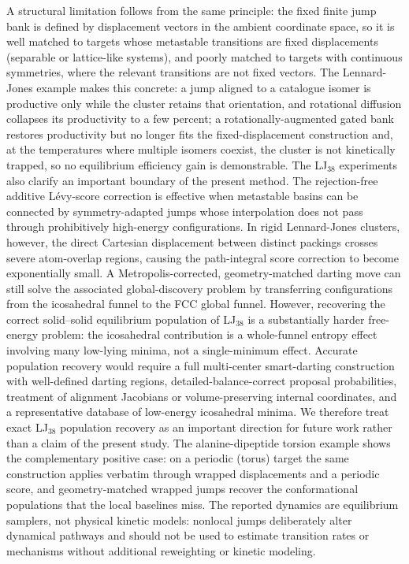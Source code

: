 A structural limitation follows from the same principle: the fixed finite jump bank is defined by displacement vectors in the ambient coordinate space, so it is well matched to targets whose metastable transitions are fixed displacements (separable or lattice-like systems), and poorly matched to targets with continuous symmetries, where the relevant transitions are not fixed vectors. The Lennard-Jones example makes this concrete: a jump aligned to a catalogue isomer is productive only while the cluster retains that orientation, and rotational diffusion collapses its productivity to a few percent; a rotationally-augmented gated bank restores productivity but no longer fits the fixed-displacement construction and, at the temperatures where multiple isomers coexist, the cluster is not kinetically trapped, so no equilibrium efficiency gain is demonstrable. The LJ$_{38}$ experiments also clarify an important boundary of the present method. The rejection-free additive L\'evy-score correction is effective when metastable basins can be connected by symmetry-adapted jumps whose interpolation does not pass through prohibitively high-energy configurations. In rigid Lennard-Jones clusters, however, the direct Cartesian displacement between distinct packings crosses severe atom-overlap regions, causing the path-integral score correction to become exponentially small. A Metropolis-corrected, geometry-matched darting move can still solve the associated global-discovery problem by transferring configurations from the icosahedral funnel to the FCC global funnel. However, recovering the correct solid--solid equilibrium population of LJ$_{38}$ is a substantially harder free-energy problem: the icosahedral contribution is a whole-funnel entropy effect involving many low-lying minima, not a single-minimum effect. Accurate population recovery would require a full multi-center smart-darting construction with well-defined darting regions, detailed-balance-correct proposal probabilities, treatment of alignment Jacobians or volume-preserving internal coordinates, and a representative database of low-energy icosahedral minima. We therefore treat exact LJ$_{38}$ population recovery as an important direction for future work rather than a claim of the present study. The alanine-dipeptide torsion example shows the complementary positive case: on a periodic (torus) target the same construction applies verbatim through wrapped displacements and a periodic score, and geometry-matched wrapped jumps recover the conformational populations that the local baselines miss. The reported dynamics are equilibrium samplers, not physical kinetic models: nonlocal jumps deliberately alter dynamical pathways and should not be used to estimate transition rates or mechanisms without additional reweighting or kinetic modeling.
